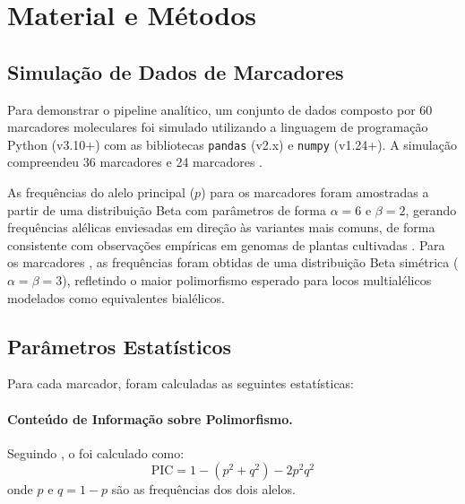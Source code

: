 
\section{Material e Métodos}
\label{sec:methods}

\subsection{Simulação de Dados de Marcadores}
\label{sec:sim}

Para demonstrar o pipeline analítico, um conjunto de dados composto por
60 marcadores moleculares foi simulado utilizando a linguagem de programação
Python (v3.10+) com as bibliotecas \texttt{pandas} (v2.x) e
\texttt{numpy} (v1.24+). A simulação compreendeu 36 marcadores \snp{} e
24 marcadores \ssr{}.

As frequências do alelo principal ($p$) para os marcadores \snp{} foram
amostradas a partir de uma distribuição Beta com parâmetros de forma
$\alpha = 6$ e $\beta = 2$, gerando frequências alélicas enviesadas em
direção às variantes mais comuns, de forma consistente com observações
empíricas em genomas de plantas cultivadas \autocite{Elshire2011}. Para
os marcadores \ssr{}, as frequências foram obtidas de uma distribuição
Beta simétrica ($\alpha = \beta = 3$), refletindo o maior polimorfismo
esperado para locos multialélicos modelados como equivalentes bialélicos.

\subsection{Parâmetros Estatísticos}
\label{sec:stats}

Para cada marcador, foram calculadas as seguintes estatísticas:

\paragraph{Conteúdo de Informação sobre Polimorfismo.}
Seguindo \textcite{Botstein1980}, o \pic{} foi calculado como:
\begin{equation}
    \text{PIC} = 1 - \left(p^2 + q^2\right) - 2p^2q^2
    \label{eq:pic}
\end{equation}
onde $p$ e $q = 1 - p$ são as frequências dos dois alelos.

